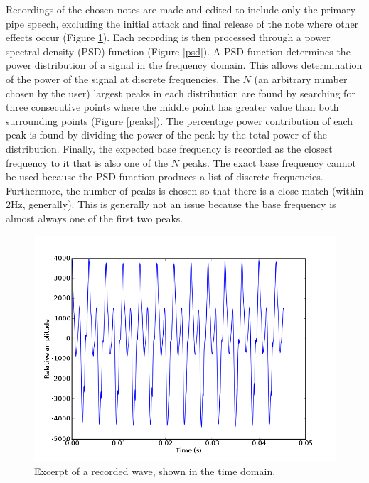 \documentclass[twocolumn]{article}
\begin{document}
Recordings of the chosen notes are made and edited to include only the primary pipe speech, excluding the initial attack and final release of the note where other effects occur (Figure \ref{time}). Each recording is then processed through a power spectral density (PSD) function (Figure \ref{psd}). A PSD function determines the power distribution of a signal in the frequency domain. This allows determination of the power of the signal at discrete frequencies. The $N$ (an arbitrary number chosen by the user) largest peaks in each distribution are found by searching for three consecutive points where the middle point has greater value than both surrounding points (Figure \ref{peaks}). The percentage power contribution of each peak is found by dividing the power of the peak by the total power of the distribution. Finally, the expected base frequency is recorded as the closest frequency to it that is also one of the $N$ peaks. The exact base frequency cannot be used because the PSD function produces a list of discrete frequencies. Furthermore, the number of peaks is chosen so that there is a close match (within 2Hz, generally). This is generally not an issue because the base frequency is almost always one of the first two peaks.

\begin{figure}
\centering
\includegraphics[width=\linewidth]{figures/time.png}
\caption{Excerpt of a recorded wave, shown in the time domain.}
\label{time}
\end{figure}
\end{document}
